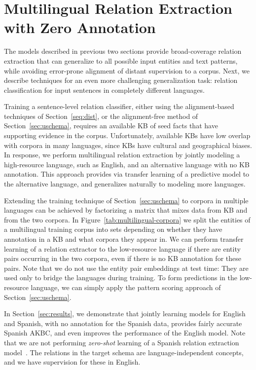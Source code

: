 \section{Multilingual Relation Extraction with Zero Annotation \label{sec:multilingual}}

The models described in previous two sections provide broad-coverage relation extraction that can generalize to all possible input entities and text patterns, while avoiding error-prone alignment of distant supervision to a corpus. Next, we describe techniques for an even more challenging generalization task: relation classification for input sentences in completely different languages.

Training a sentence-level relation classifier, either using the alignment-based techniques of Section~\ref{seq:dist}, or the alignment-free method of Section~\ref{sec:uschema}, requires an available KB of seed facts that have supporting evidence in the corpus.  Unfortunately, available KBs have low overlap with corpora in many languages, since KBs have cultural and geographical biases. In response, we perform multilingual relation extraction by jointly modeling a high-resource language, such as English, and an alternative language with no KB annotation. This approach provides via transfer learning of a predictive model to the alternative language, and generalizes naturally to modeling more languages. 


Extending the training technique of Section~\ref{sec:uschema} to corpora in multiple languages can be achieved by factorizing a matrix that mixes data from KB and from the two corpora. In Figure~\ref{tab:multilingual-corpora} we split the entities of a multilingual training corpus into sets depending on whether they have annotation in a KB and what corpora they appear in. We can perform transfer learning of a relation extractor to the low-resource language if there are entity pairs occurring in the two corpora, even if there is no KB annotation for these pairs. Note that we do not use the entity pair embeddings at test time: They are used only to bridge the languages during training. To form predictions in the low-resource language, we can simply apply the pattern scoring approach of Section~\ref{sec:uschema}.

In Section~\ref{sec:results}, we demonstrate that jointly learning models for English and Spanish, with no annotation for the Spanish data, provides fairly accurate Spanish AKBC, and even improves the performance of the English model. Note that we are not performing \textit{zero-shot} learning of a Spanish relation extraction model~\citep{zeroshot}. The relations in the target schema are language-independent concepts, and we have supervision for these in English. 

